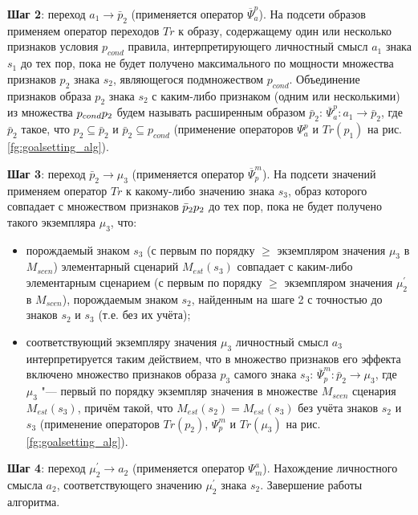 \begin{appendices}
\textbf{Шаг 2}: переход $a_1\rightarrow\bar p_2$  (применяется оператор $\overline{\Psi}_a^p$). На подсети образов применяем оператор переходов $Tr$ к образу, содержащему один или несколько признаков условия $p_{cond}$ правила, интерпретирующего личностный смысл $a_1$ знака $s_1$ до тех пор, пока не будет получено максимального по мощности множества признаков $p_2$ знака $s_2$, являющегося подмножеством $p_{cond}$. Объединение признаков образа $p_2$ знака $s_2$ с каким-либо признаком (одним или несколькими) из множества $p_{cond}\\p_2$ будем называть расширенным образом $\bar p_2$: $\overline{\Psi}_a^p:a_1\rightarrow\bar p_2$, где $\bar p_2$ такое, что $p_2\subseteq\bar p_2$  и  $\bar p_2\subseteq p_{cond}$ (применение операторов $\Psi_a^p$ и $Tr(p_1)$ на рис. \ref{fg:goalsetting_alg}).

\textbf{Шаг 3}: переход $\bar p_2\rightarrow\mu_3$ (применяется оператор $\overline{\Psi}_p^m$). На подсети значений применяем оператор $Tr$ к какому-либо значению знака $s_3$, образ которого совпадает с множеством признаков $\bar p_2\\p_2$ до тех пор, пока не будет получено такого экземпляра $\mu_3$, что:
\begin{itemize}
	\item порождаемый знаком $s_3$ (с первым по порядку $\geqslant$ экземпляром значения $\mu_3$ в $M_{scen}$) элементарный сценарий $M_{est}(s_3)$ совпадает с каким-либо элементарным сценарием (с первым по порядку $\geqslant$ экземпляром значения $\mu^\prime_2$ в $M_{scen}$), порождаемым знаком $s_2$, найденным на шаге 2 с точностью до знаков $s_2$ и $s_3$ (т.е. без их учёта);
	\item соответствующий экземпляру значения $\mu_3$ личностный смысл $a_3$ интерпретируется таким действием, что в множество признаков его эффекта включено множество признаков образа $p_3$ самого знака $s_3$: $\overline{\Psi}_p^m:\bar p_2\rightarrow\mu_3$, где $\mu_3$ "--- первый по порядку экземпляр значения в множестве $M_{scen}$ сценария $M_{est}(s_3)$, причём   такой, что $M_{est}(s_2)=M_{est}(s_3)$ без учёта знаков $s_2$ и $s_3$ (применение операторов $Tr(p_2)$, $\Psi_p^m$ и $Tr(\mu_3)$ на рис. \ref{fg:goalsetting_alg}).
\end{itemize}

\textbf{Шаг 4}: переход $\mu^\prime_2\rightarrow a_2$ (применяется оператор $\Psi_m^a$). Нахождение личностного смысла $a_2$, соответствующего значению $\mu^\prime_2$ знака $s_2$. Завершение работы алгоритма.


\end{appendices}
